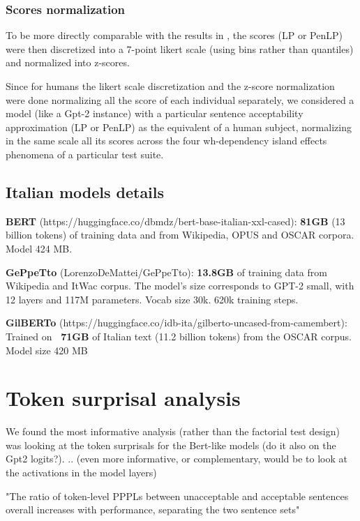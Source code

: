 \subsubsection{Scores normalization}

To be more directly comparable with the results in \citet{sprouse2016experimental}, the scores (LP or PenLP) were then discretized into a 7-point likert scale (using bins rather than quantiles) and normalized into z-scores.

Since for humans the likert scale discretization and the z-score normalization were done normalizing all the score of each individual separately, we considered a model (like a Gpt-2 instance) with a particular sentence acceptability approximation (LP or PenLP) as the equivalent of a human subject, normalizing in the same scale all its scores across the four wh-dependency island effects phenomena of a particular test suite.


\subsection{Italian models details}

\textbf{BERT} (https://huggingface.co/dbmdz/bert-base-italian-xxl-cased): \textbf{81GB} (13 billion tokens) of training data  and from Wikipedia, OPUS and OSCAR corpora. Model 
424 MB.

\textbf{GePpeTto} (LorenzoDeMattei/GePpeTto): \textbf{13.8GB} of training data from Wikipedia and ItWac corpus. The model’s size corresponds to GPT-2 small, with 12 layers and 117M parameters. Vocab size 30k. 620k training steps.

\textbf{GilBERTo} (https://huggingface.co/idb-ita/gilberto-uncased-from-camembert): Trained on \textbf{~71GB} of Italian text (11.2 billion tokens) from the OSCAR corpus. Model size 420 MB

\section{Token surprisal analysis}

We found the most informative analysis (rather than the factorial test design) was looking at the token surprisals for the Bert-like models (do it also on the Gpt2 logits?).
..
(even more informative, or complementary, would be to look at the activations in the model layers)



"The ratio of token-level PPPLs between unacceptable and
acceptable sentences overall increases with performance, separating the two sentence sets" \citep{salazar2020masked}

